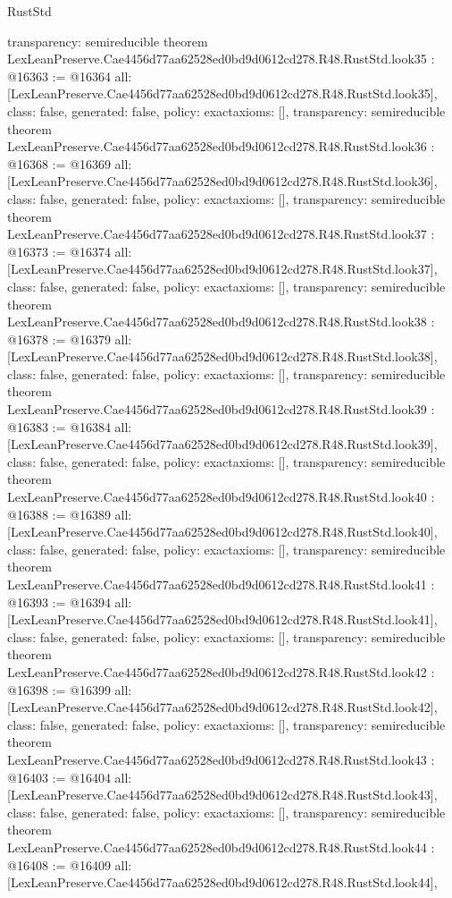 \begin{lexlean}{RustStd}
\begin{coremodule}
{  transparency: semireducible
}
theorem LexLeanPreserve.Cae4456d77aa62528ed0bd9d0612cd278.R48.RustStd.look35 : @16363 := @16364 {
  all: [LexLeanPreserve.Cae4456d77aa62528ed0bd9d0612cd278.R48.RustStd.look35],
  class: false,
  generated: false,
  policy: exact{axioms: []},
  transparency: semireducible
}
theorem LexLeanPreserve.Cae4456d77aa62528ed0bd9d0612cd278.R48.RustStd.look36 : @16368 := @16369 {
  all: [LexLeanPreserve.Cae4456d77aa62528ed0bd9d0612cd278.R48.RustStd.look36],
  class: false,
  generated: false,
  policy: exact{axioms: []},
  transparency: semireducible
}
theorem LexLeanPreserve.Cae4456d77aa62528ed0bd9d0612cd278.R48.RustStd.look37 : @16373 := @16374 {
  all: [LexLeanPreserve.Cae4456d77aa62528ed0bd9d0612cd278.R48.RustStd.look37],
  class: false,
  generated: false,
  policy: exact{axioms: []},
  transparency: semireducible
}
theorem LexLeanPreserve.Cae4456d77aa62528ed0bd9d0612cd278.R48.RustStd.look38 : @16378 := @16379 {
  all: [LexLeanPreserve.Cae4456d77aa62528ed0bd9d0612cd278.R48.RustStd.look38],
  class: false,
  generated: false,
  policy: exact{axioms: []},
  transparency: semireducible
}
theorem LexLeanPreserve.Cae4456d77aa62528ed0bd9d0612cd278.R48.RustStd.look39 : @16383 := @16384 {
  all: [LexLeanPreserve.Cae4456d77aa62528ed0bd9d0612cd278.R48.RustStd.look39],
  class: false,
  generated: false,
  policy: exact{axioms: []},
  transparency: semireducible
}
theorem LexLeanPreserve.Cae4456d77aa62528ed0bd9d0612cd278.R48.RustStd.look40 : @16388 := @16389 {
  all: [LexLeanPreserve.Cae4456d77aa62528ed0bd9d0612cd278.R48.RustStd.look40],
  class: false,
  generated: false,
  policy: exact{axioms: []},
  transparency: semireducible
}
theorem LexLeanPreserve.Cae4456d77aa62528ed0bd9d0612cd278.R48.RustStd.look41 : @16393 := @16394 {
  all: [LexLeanPreserve.Cae4456d77aa62528ed0bd9d0612cd278.R48.RustStd.look41],
  class: false,
  generated: false,
  policy: exact{axioms: []},
  transparency: semireducible
}
theorem LexLeanPreserve.Cae4456d77aa62528ed0bd9d0612cd278.R48.RustStd.look42 : @16398 := @16399 {
  all: [LexLeanPreserve.Cae4456d77aa62528ed0bd9d0612cd278.R48.RustStd.look42],
  class: false,
  generated: false,
  policy: exact{axioms: []},
  transparency: semireducible
}
theorem LexLeanPreserve.Cae4456d77aa62528ed0bd9d0612cd278.R48.RustStd.look43 : @16403 := @16404 {
  all: [LexLeanPreserve.Cae4456d77aa62528ed0bd9d0612cd278.R48.RustStd.look43],
  class: false,
  generated: false,
  policy: exact{axioms: []},
  transparency: semireducible
}
theorem LexLeanPreserve.Cae4456d77aa62528ed0bd9d0612cd278.R48.RustStd.look44 : @16408 := @16409 {
  all: [LexLeanPreserve.Cae4456d77aa62528ed0bd9d0612cd278.R48.RustStd.look44],
}
\end{coremodule}
\end{lexlean}
